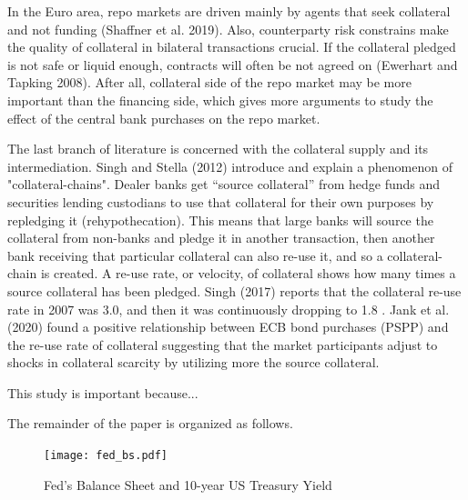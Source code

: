 \documentclass[11pt,a4paper,english,oneside]{article}
\begin{document}
In the Euro area, repo markets are driven mainly by agents that seek collateral and not funding (Shaffner et al. 2019). Also, counterparty risk constrains make the quality of collateral in bilateral transactions crucial. If the collateral pledged is not safe or liquid enough, contracts will often be not agreed on (Ewerhart and Tapking 2008). After all, collateral side of the repo market may be more important than the financing side, which gives more arguments to study the effect of the central bank purchases on the repo market.

The last branch of literature is concerned with the collateral supply and its intermediation. Singh and Stella (2012) introduce and explain a phenomenon of "collateral-chains". Dealer banks get “source collateral” from hedge funds and securities lending custodians to use that collateral for their own purposes by repledging it (rehypothecation). This means that large banks will source the collateral from non-banks and pledge it in another transaction, then another bank receiving that particular collateral can also re-use it, and so a collateral-chain is created. A re-use rate, or velocity, of collateral shows how many times a source collateral has been pledged. Singh (2017) reports that the collateral re-use rate in 2007 was 3.0, and then it was continuously dropping to 1.8 . Jank et al. (2020) found a positive relationship between ECB bond purchases (PSPP) and the re-use rate of collateral suggesting that the market participants adjust to shocks in collateral scarcity by utilizing more the source collateral.

This study is important because...

The remainder of the paper is organized as follows. 


\begin{figure}[htb!]
  \begin{center}
    \caption{Fed's Balance Sheet and 10-year US Treasury Yield}
    \texttt{[image: fed\_bs.pdf]}
  \end{center}
  \label{Feds_BS}
\end{figure}
\end{document}
